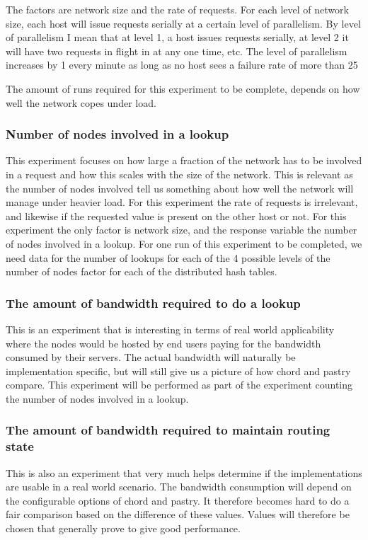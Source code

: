 The factors are network size and the rate of requests. 
For each level of network size, each host will issue requests serially at a certain level of parallelism. By level of parallelism I mean that at level 1, a host issues requests serially, at level 2 it will have two requests in flight in at any one time, etc. The level of parallelism increases by 1 every minute as long as no host sees a failure rate of more than 25%

The amount of runs required for this experiment to be complete, depends on how well the network copes under load.

\subsubsection{Number of nodes involved in a lookup}
This experiment focuses on how large a fraction of the network has to be involved in a request and how this scales with the size of the network. This is relevant as the number of nodes involved tell us something about how well the network will manage under heavier load.
For this experiment the rate of requests is irrelevant, and likewise if the requested value is present on the other host or not.
For this experiment the only factor is network size, and the response variable the number of nodes involved in a lookup.
For one run of this experiment to be completed, we need data for the number of lookups for each of the 4 possible levels of the number of nodes factor for each of the distributed hash tables.

\subsubsection{The amount of bandwidth required to do a lookup}
This is an experiment that is interesting in terms of real world applicability where the nodes would be hosted by end users paying for the bandwidth consumed by their servers. The actual bandwidth will naturally be implementation specific, but will still give us a picture of how chord and pastry compare.
This experiment will be performed as part of the experiment counting the number of nodes involved in a lookup.

\subsubsection{The amount of bandwidth required to maintain routing state}
This is also an experiment that very much helps determine if the implementations are usable in a real world scenario.
The bandwidth consumption will depend on the configurable options of chord and pastry. It therefore becomes hard to do a fair comparison based on the difference of these values. Values will therefore be chosen that generally prove to give good performance.

